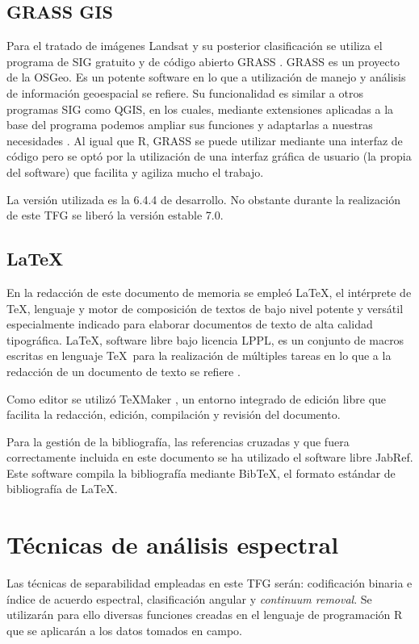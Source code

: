 \subsection{GRASS GIS}
Para el tratado de imágenes Landsat y su posterior clasificación se utiliza el programa de \ac{SIG} gratuito y de código abierto \ac{GRASS} \citep{GRASS_GIS_software}. GRASS es un proyecto de la \ac{OSGeo}. Es un potente software en lo que a utilización de manejo y análisis de información geoespacial se refiere. Su funcionalidad es similar a otros programas \ac{SIG} como QGIS, en los cuales, mediante extensiones aplicadas a la base del programa podemos ampliar sus funciones y adaptarlas a nuestras necesidades \citep{neteler2002open}. Al igual que R, \ac{GRASS} se puede utilizar mediante una interfaz de código pero se optó por la utilización de una interfaz gráfica de usuario (la propia del software) que facilita y agiliza mucho el trabajo.\Sep

La versión utilizada es la 6.4.4 de desarrollo. No obstante durante la realización de este \ac{TFG} se liberó la versión estable 7.0.

\subsection{\LaTeX}
En la redacción de este documento de memoria se empleó \LaTeX, el intérprete de \TeX, lenguaje y motor de composición de textos de bajo nivel potente y versátil especialmente indicado para elaborar documentos de texto de alta calidad tipográfica. \LaTeX, software libre bajo licencia LPPL, es un conjunto de macros escritas en lenguaje \TeX\ para la realización de múltiples tareas en lo que a la redacción de un documento de texto se refiere \citep{Latex2011} \citep{galindo2001} \citep{lamport1994}.\Sep

Como editor se utilizó TeXMaker \citep{Brachet2003}, un entorno integrado de edición libre que facilita la redacción, edición, compilación y revisión del documento.\Sep

Para la gestión de la bibliografía, las referencias cruzadas y que fuera correctamente incluida en este documento se ha utilizado el software libre JabRef. Este software compila la bibliografía mediante BibTeX, el formato estándar de bibliografía de \LaTeX.

\section{Técnicas de análisis espectral} \label{sec:tecnicas}
Las técnicas de separabilidad empleadas en este \ac{TFG} serán: codificación binaria e índice de acuerdo espectral, clasificación angular y \textit{continuum removal}. Se utilizarán para ello diversas funciones creadas en el lenguaje de programación R que se aplicarán a los datos tomados en campo.

